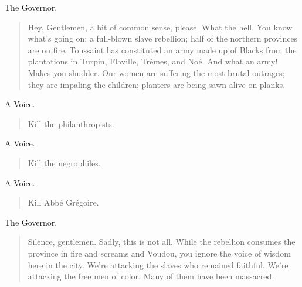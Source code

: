 \documentclass[letterpaper,article,12pt,oneside,notitlepage]{memoir}
\begin{document}
\begin{center}The Governor.\end{center}

\begin{verse}
\indent Hey, Gentlemen, a bit of common sense, please. What the hell. You know what's going on: a full-blown slave rebellion; half of the northern provinces are on fire. Toussaint has constituted an army made up of Blacks from the plantations in Turpin, Flaville, Trêmes, and Noé. And what an army! Makes you shudder. Our women are suffering the most brutal outrages; they are impaling the children; planters are being sawn alive on planks. \\
\end{verse}

\begin{center}A Voice.\end{center}

\begin{verse}
\hspace{1cm} Kill the philanthropists. \\
\end{verse}

\begin{center}A Voice.\end{center}

\begin{verse}
\hspace{1cm} Kill the negrophiles. \\
\end{verse}

\begin{center}A Voice.\end{center}

\begin{verse}
\hspace{1cm} Kill Abbé Grégoire. \\
\end{verse}

\begin{center}The Governor.\end{center}

\begin{verse}
\indent Silence, gentlemen. Sadly, this is not all. While the rebellion consumes the province in fire and screams and Voudou, you ignore the voice of wisdom here in the city. We're attacking the slaves who remained faithful. We're attacking the free men of color. Many of them have been massacred. \\
\end{verse}
\end{document}
